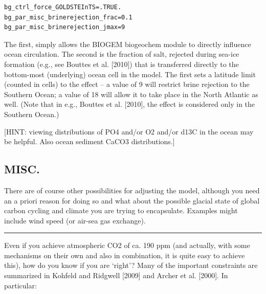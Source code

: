 \documentclass[11pt,fleqn]{book} %
\begin{document}
\vspace{-2mm}\begin{verbatim}
bg_ctrl_force_GOLDSTEInTS=.TRUE.
bg_par_misc_brinerejection_frac=0.1
bg_par_misc_brinerejection_jmax=9
\end{verbatim}\vspace{-2mm}

The first, simply allows the BIOGEM biogeochem module to directly influence ocean
circulation. The second is the fraction of salt, rejected during sea-ice formation (e.g., see
Bouttes et al. [2010]) that is transferred directly to the bottom-most (underlying) ocean cell
in the model. The first sets a latitude limit (counted in cells) to the effect -- a value of 9 will
restrict brine rejection to the Southern Ocean; a value of 18 will allow it to take place in the
North Atlantic as well. (Note that in e.g., Bouttes et al. [2010], the effect is considered only
in the Southern Ocean.)

[HINT: viewing distributions of PO4 and/or O2 and/or d13C in the ocean may be helpful. Also
ocean sediment CaCO3 distributions.]

%
\subsection*{MISC.}

There are of course other possibilities for adjusting the model, although you need an
a priori reason for doing so and what about the possible glacial state of global carbon
cycling and climate you are trying to encapsulate. Examples might include wind speed (or
air-sea gas exchange).

\vspace{1mm}
\noindent\rule{4cm}{0.5pt}
\vspace{2mm}

Even if you achieve atmospheric CO2 of ca. 190 ppm (and actually, with some mechanisms on
their own and also in combination, it is quite easy to achieve this), how do you know if you are ‘right’? Many of the important constraints are summarized in Kohfeld and Ridgwell [2009] and
Archer et al. [2000]. In particular:
\end{document}
